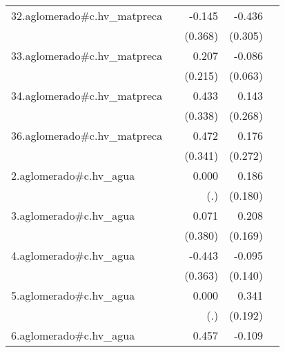 {\begin{longtable}{l*{4}{D{.}{.}{-1}}}
\addlinespace
32.aglomerado#c.hv\_matpreca&                     &      -0.145         &      -0.436         &                     \\
            &                     &     (0.368)         &     (0.305)         &                     \\
\addlinespace
33.aglomerado#c.hv\_matpreca&                     &       0.207         &      -0.086         &                     \\
            &                     &     (0.215)         &     (0.063)         &                     \\
\addlinespace
34.aglomerado#c.hv\_matpreca&                     &       0.433         &       0.143         &                     \\
            &                     &     (0.338)         &     (0.268)         &                     \\
\addlinespace
36.aglomerado#c.hv\_matpreca&                     &       0.472         &       0.176         &                     \\
            &                     &     (0.341)         &     (0.272)         &                     \\
\addlinespace
2.aglomerado#c.hv\_agua&                     &       0.000         &       0.186         &                     \\
            &                     &         (.)         &     (0.180)         &                     \\
\addlinespace
3.aglomerado#c.hv\_agua&                     &       0.071         &       0.208         &                     \\
            &                     &     (0.380)         &     (0.169)         &                     \\
\addlinespace
4.aglomerado#c.hv\_agua&                     &      -0.443         &      -0.095         &                     \\
            &                     &     (0.363)         &     (0.140)         &                     \\
\addlinespace
5.aglomerado#c.hv\_agua&                     &       0.000         &       0.341         &                     \\
            &                     &         (.)         &     (0.192)         &                     \\
\addlinespace
6.aglomerado#c.hv\_agua&                     &       0.457         &      -0.109         &                     \\

\end{longtable}}
